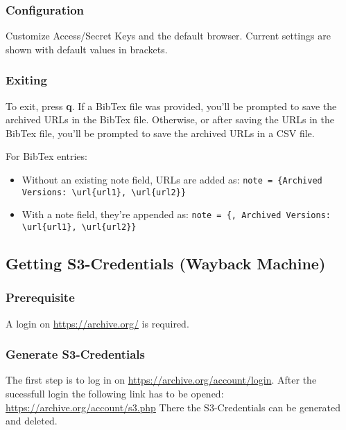 \subsubsection{Configuration}

Customize Access/Secret Keys and the default browser. Current settings are shown with default values in brackets.

\subsubsection{Exiting}

To exit, press \textbf{q}. If a BibTex file was provided, you'll be prompted to save the archived URLs in the BibTex file. Otherwise, or after saving the URLs in the BibTex file, you'll be prompted to save the archived URLs in a CSV file.

For BibTex entries:
\begin{itemize}
	\item Without an existing note field, URLs are added as: \texttt{note = \{Archived Versions: \textbackslash url\{url1\}, \textbackslash url\{url2\}\}}
	\item With a note field, they're appended as: \texttt{note = \{<current note>, Archived Versions: \textbackslash url\{url1\}, \textbackslash url\{url2\}\}}
\end{itemize}


\subsection{Getting S3-Credentials (Wayback Machine)}

\subsubsection{Prerequisite}
A login on \url{https://archive.org/} is required. 

\subsubsection{Generate S3-Credentials}

The first step is to log in on \url{https://archive.org/account/login}. 
After the sucessfull login the following link has to be opened: \url{https://archive.org/account/s3.php}
There the S3-Credentials can be generated and deleted.